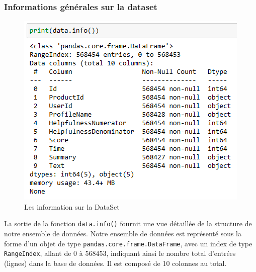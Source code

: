\subsubsection{Informations générales sur la dataset}
\begin{figure}[h]
    \centering
    \includegraphics[scale=0.5]{assets/datainfo.PNG}
    \caption{Les information sur la DataSet}
    \label{fig:dataframeinfo}
\end{figure}
La sortie de la fonction \texttt{data.info()} fournit une vue détaillée de la structure de notre ensemble de données. Notre ensemble de données est représenté sous la forme d'un objet de type \texttt{pandas.core.frame.DataFrame}, avec un index de type \texttt{RangeIndex}, allant de 0 à 568453, indiquant ainsi le nombre total d'entrées (lignes) dans la base de données. Il est composé de 10 colonnes au total.

